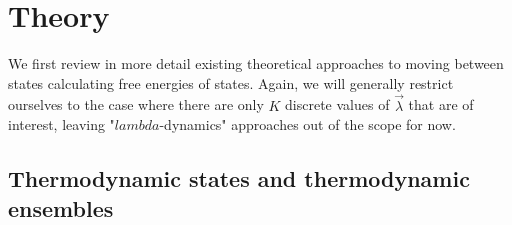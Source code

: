 \documentclass[superscriptaddress,showkeys, nofootinbib, pre, aps]{revtex4-1}
\begin{document}


\section{\label{sec:theory}Theory}

We first review in more detail existing theoretical approaches to moving between states calculating free energies of states. Again, we will generally restrict ourselves to the case where there are only $K$ discrete values of $\vec{\lambda}$ that are of interest, leaving "$lambda$-dynamics" approaches out of the scope for now.

\subsection{\label{sec:ensembles}Thermodynamic states and thermodynamic ensembles}
\end{document}
